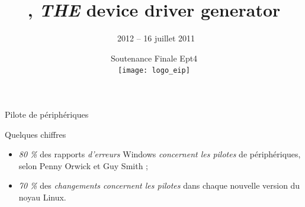 \documentclass{beamer}
\title[\rtx, \emph{THE} device driver generator]{\rtx, \emph{THE} device driver generator \vspace{-20pt}}
\date[Soutenance Finale Ept4]{Soutenance Finale Ept4 \\ \vspace{10pt} \texttt{[image: logo\_eip]}}
\author[\rtx\ 2012 -- 16 juillet 2011]{\rtx\ 2012 -- 16 juillet 2011 \vspace{-20pt}}
\newcommand{\cemph}[1]{{\itshape{\textcolor{rathaxesred}{#1}}}}
\begin{document}
\begin{frame}
\titlepage
\end{frame}

\begin{frame}{Pilote de périphériques}
\begin{center}


\end{center}
\end{frame}

\begin{frame}{Quelques chiffres}
\Large{
\begin{itemize}
\setlength{\itemsep}{1em}
\item {\LARGE \emph{80 \%}} des rapports \cemph{d'erreurs} Windows \cemph{concernent les pilotes} de périphériques, selon Penny Orwick et Guy Smith ;
\item {\LARGE \emph{70 \%}} des \cemph{changements concernent les pilotes} dans chaque nouvelle version du noyau Linux.
\end{itemize}
}
\end{frame}
\end{document}
